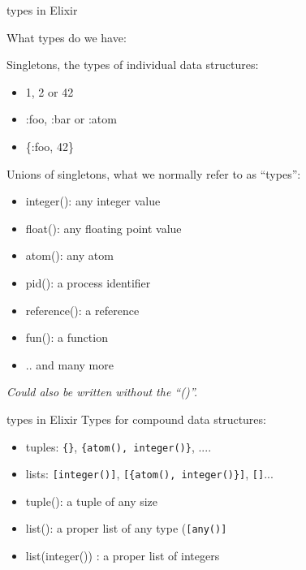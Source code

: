 \begin{frame}{types in Elixir}

What types do we have:

\pause\vspace{10pt}
Singletons, the types of individual data structures:
\begin{itemize}
\item  1, 2 or 42
\item :foo, :bar or :atom
\item  \{:foo, 42\}
\end{itemize}
\pause\vspace{10pt}
Unions of singletons, what we normally refer to as ``types'':
\begin{itemize}
\item integer(): any integer value 
\item float(): any floating point value 
\item atom(): any atom 
\item pid(): a process identifier
\item reference(): a reference
\item fun(): a function 
\item .. and many more
\end{itemize}

{\em Could also be written without the ``()''. }
\end{frame}

\begin{frame}{types in Elixir}
Types for compound data structures:
\pause\vspace{10pt}
\begin{itemize}
\item  tuples: {\tt \{\}}, {\tt \{atom(), integer()\}}, ....
\item  lists: {\tt [integer()]}, {\tt [\{atom(), integer()\}]}, {\tt []}... \pause
\end{itemize}

\begin{itemize}
\item  tuple(): a tuple of any size \pause
\item  list(): a proper list of any type ({\tt [any()]} \pause
\item  list(integer()) : a proper list of integers \pause
\end{itemize} \pause

\end{frame}


